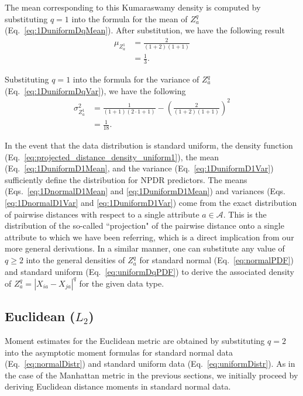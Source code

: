 \documentclass[aoas]{imsart}
\begin{document}
The mean corresponding to this Kumaraswamy density is computed by substituting $q=1$ into the formula for the mean of $Z^q_a$ (Eq.~\ref{eq:1DuniformDqMean}). After substitution, we have the following result
%
\begin{equation}\label{eq:1DuniformD1Mean}
\begin{aligned}
\mu_{Z^1_a} &= \frac{2}{(1 + 2)(1 + 1)} \\
&= \frac{1}{3}.
\end{aligned}
\end{equation}

Substituting $q=1$ into the formula for the variance of $Z^q_a$ (Eq.~\ref{eq:1DuniformDqVar}), we have the following
%
\begin{equation}\label{eq:1DuniformD1Var}
\begin{aligned}
\sigma^2_{Z^1_a} &= \frac{1}{(1 + 1)(2\cdot 1 + 1)} - \left(\frac{2}{(1 + 2)(1 + 1)}\right)^2 \\
&= \frac{1}{18}.
\end{aligned}
\end{equation}

In the event that the data distribution is standard uniform, the density function (Eq.~\ref{eq:projected_distance_density_uniform1}), the mean (Eq.~\ref{eq:1DuniformD1Mean}, and the variance (Eq.~\ref{eq:1DuniformD1Var}) sufficiently define the distribution for NPDR predictors. The means (Eqs.~\ref{eq:1DnormalD1Mean} and \ref{eq:1DuniformD1Mean}) and variances (Eqs.\ref{eq:1DnormalD1Var} and \ref{eq:1DuniformD1Var}) come from the exact distribution of pairwise distances with respect to a single attribute $a \in \mathcal{A}$. This is the distribution of the so-called ``projection" of the pairwise distance onto a single attribute to which we have been referring, which is a direct implication from our more general derivations. In a similar manner, one can substitute any value of $q \geq 2$ into the general densities of $Z^q_a$ for standard normal (Eq.~\ref{eq:normalPDF}) and standard uniform (Eq.~\ref{eq:uniformDqPDF}) to derive the associated density of $Z^q_a = |X_{ia} - X_{ja}|^q$ for the given data type.

\subsection{Euclidean \texorpdfstring{($L_2$)}{}}

Moment estimates for the Euclidean metric are obtained by substituting $q=2$ into the asymptotic moment formulas for standard normal data (Eq.~\ref{eq:normalDistr}) and standard uniform data (Eq.~\ref{eq:uniformDistr}). As in the case of the Manhattan metric in the previous sections, we initially proceed by deriving Euclidean distance moments in standard normal data.
\end{document}

